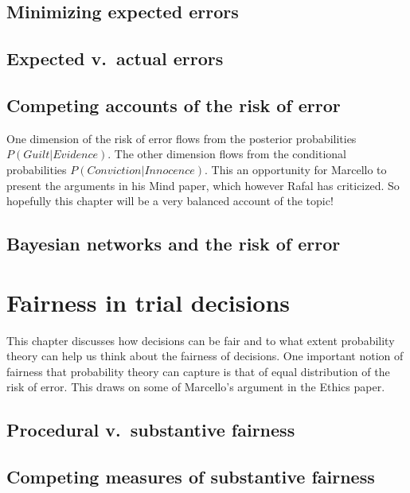 \documentclass[]{book}
\begin{document}
\section{Minimizing expected errors}

\section{Expected v.\ actual errors}

\section{Competing accounts 
of the risk of error}

One dimension of the risk of error
flows from the posterior probabilities \(P(Guilt | Evidence)\).
The other dimension flows from the conditional probabilities
\(P(Conviction | Innocence)\).
This an opportunity for Marcello to present the arguments in his Mind paper,
which however Rafal has criticized. So hopefully this chapter
will be a very balanced account of the topic!

\section{Bayesian networks and 
the risk of error}

\chapter{Fairness in trial decisions}

This chapter discusses how decisions can be fair and to what extent probability
theory can help us think about the fairness of decisions.
One important notion of fairness that probability theory
can capture is that of equal distribution of the risk of error.
This draws on some of Marcello's argument in the Ethics paper.


\section{Procedural v.\ substantive fairness}

\section{Competing measures of substantive fairness}
\end{document}
